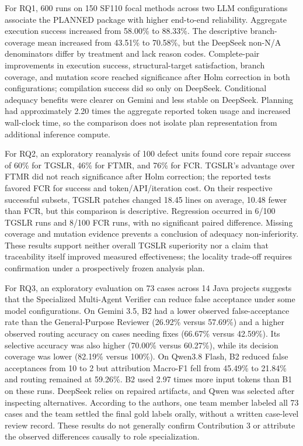 \documentclass[pdflatex,sn-basic,Numbered,iicol]{sn-jnl}
\begin{document}
For RQ1, 600 runs on 150 SF110 focal methods across two LLM configurations associate the PLANNED package with higher end-to-end reliability. Aggregate execution success increased from 58.00\% to 88.33\%. The descriptive branch-coverage mean increased from 43.51\% to 70.58\%, but the DeepSeek non-N/A denominators differ by treatment and lack reason codes. Complete-pair improvements in execution success, structural-target satisfaction, branch coverage, and mutation score reached significance after Holm correction in both configurations; compilation success did so only on DeepSeek. Conditional adequacy benefits were clearer on Gemini and less stable on DeepSeek. Planning had approximately 2.20 times the aggregate reported token usage and increased wall-clock time, so the comparison does not isolate plan representation from additional inference compute.

For RQ2, an exploratory reanalysis of 100 defect units found core repair success of 60\% for TGSLR, 46\% for FTMR, and 76\% for FCR. TGSLR's advantage over FTMR did not reach significance after Holm correction; the reported tests favored FCR for success and token/API/iteration cost. On their respective successful subsets, TGSLR patches changed 18.45 lines on average, 10.48 fewer than FCR, but this comparison is descriptive. Regression occurred in 6/100 TGSLR runs and 8/100 FCR runs, with no significant paired difference. Missing coverage and mutation evidence prevents a conclusion of adequacy non-inferiority. These results support neither overall TGSLR superiority nor a claim that traceability itself improved measured effectiveness; the locality trade-off requires confirmation under a prospectively frozen analysis plan.

For RQ3, an exploratory evaluation on 73 cases across 14 Java projects suggests that the Specialized Multi-Agent Verifier can reduce false acceptance under some model configurations. On Gemini 3.5, B2 had a lower observed false-acceptance rate than the General-Purpose Reviewer (26.92\% versus 57.69\%) and a higher observed routing accuracy on cases needing fixes (66.67\% versus 42.59\%). Its selective accuracy was also higher (70.00\% versus 60.27\%), while its decision coverage was lower (82.19\% versus 100\%). On Qwen3.8 Flash, B2 reduced false acceptances from 10 to 2 but attribution Macro-F1 fell from 45.49\% to 21.84\% and routing remained at 59.26\%. B2 used 2.97 times more input tokens than B1 on these runs. DeepSeek relies on repaired artifacts, and Qwen was selected after inspecting alternatives. According to the authors, one team member labeled all 73 cases and the team settled the final gold labels orally, without a written case-level review record. These results do not generally confirm Contribution 3 or attribute the observed differences causally to role specialization.
\end{document}
